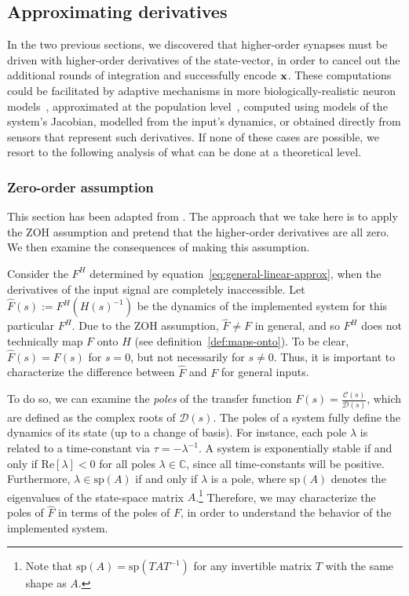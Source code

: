 \subsection{Approximating derivatives}
\label{sec:derivatives}

In the two previous sections, we discovered that higher-order synapses must be driven with higher-order derivatives of the state-vector, in order to cancel out the additional rounds of integration and successfully encode $\mathbf{x}$. 
These computations could be facilitated by adaptive mechanisms in more biologically-realistic neuron models~\citep{lundstrom2008fractional}, approximated at the population level~\citep{tripp2010}, computed using models of the system's Jacobian, modelled from the input's dynamics, or obtained directly from sensors that represent such derivatives.
If none of these cases are possible, we resort to the following analysis of what can be done at a theoretical level. 

\subsubsection{Zero-order assumption}

This section has been adapted from \citet[][appendix~A.4]{voelker2018}.
The approach that we take here is to apply the ZOH assumption and pretend that the higher-order derivatives are all zero.
We then examine the consequences of making this assumption.

Consider the $F^H$ determined by equation~\ref{eq:general-linear-approx}, when the derivatives of the input signal are completely inaccessible.
Let $\hat{F}(s) := F^{H}(H(s)^{-1})$ be the dynamics of the implemented system for this particular $F^H$.
Due to the ZOH assumption, $\hat{F} \ne F$ in general, and so $F^H$ does not technically map $F$ onto $H$ (see definition~\ref{def:maps-onto}).
To be clear, $\hat{F}(s) = F(s)$ for $s = 0$, but not necessarily for $s \ne 0$.
Thus, it is important to characterize the difference between $\hat{F}$ and $F$ for general inputs.

To do so, we can examine the \emph{poles} of the transfer function $F(s) = \frac{\mathcal{C}(s)}{\mathcal{D}(s)}$, which are defined as the complex roots of $\mathcal{D}(s)$.
The poles of a system fully define the dynamics of its state (up to a change of basis).
For instance,
each pole $\lambda$ is related to a time-constant via $\tau = -\lambda^{-1}$.
A system is exponentially stable if and only if $\text{Re} \left[ \lambda \right] < 0$ for all poles $\lambda \in \mathbb{C}$, since all time-constants will be positive.
Furthermore, $\lambda \in \text{sp}(A)$ if and only if $\lambda$ is a pole, where $\text{sp}(A)$ denotes the eigenvalues of the state-space matrix $A$.\footnote{
Note that $\text{sp}(A) = \text{sp}(TAT^{-1})$ for any invertible matrix $T$ with the same shape as $A$.
}
Therefore, we may characterize the poles of $\hat{F}$ in terms of the poles of $F$, in order to understand the behavior of the implemented system.

